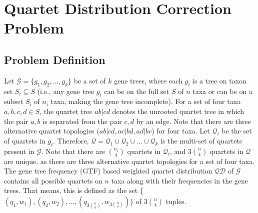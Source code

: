 \documentclass[runningheads]{llncs}
\begin{document}


\vspace{-24pt}

\section{Quartet Distribution Correction Problem}
\vspace{-20pt}
\subsection{Problem Definition}

\vspace{-22pt}

Let $\mathcal{G} =  \{g_1, g_2, \ldots, g_k\}$ be a set of $k$ gene trees, where each $g_i$ is a tree on taxon set $S_i \subseteq S$ (i.e., any gene tree $g_i$ can be on the full set $S$ of $n$ taxa or can be on a subset $S_i$ of $n_i$ taxa, making the gene tree incomplete). For a set of four taxa $a,b,c,d \in S$, the quartet tree $ab|cd$ denotes the unrooted quartet tree in which the pair $a, b$ is separated from the pair $c, d$ by an edge. Note that there are three alternative quartet topologies ($ab|cd, ac|bd, ad|bc$) for four taxa.
Let $\mathcal{Q}_i$ be the set of quartets in $g_i$. Therefore, $\mathcal{Q} = \mathcal{Q}_1 \cup \mathcal{Q}_2 \cup \ldots \cup \mathcal{Q}_k$ is the multi-set of quartets present in $\mathcal{G}$. Note that there are $n_i \choose 4$ quartets in $\mathcal{Q}_i$, and $3$$n \choose 4$ quartets in $\mathcal{Q}$ are unique, as there are three alternative quartet topologies for a set of four taxa. %
The gene tree frequency (GTF) based weighted quartet distribution $\mathcal{QD}$ of $\mathcal{G}$ contains all possible quartets on $n$ taxa along with their frequencies in the gene trees. That means, this is defined as the set \{$(q_1,w_1), (q_2,w_2), \ldots, (q_{3{n \choose 4}},w_{3{n \choose 4}})\}$ of $3$$n \choose 4$ tuples. %
\end{document}
